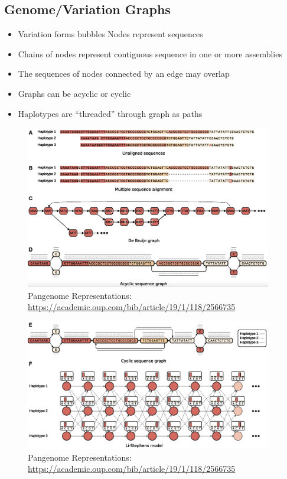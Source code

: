 \documentclass[
]{book}
\providecommand{\tightlist}{%
  \setlength{\itemsep}{0pt}\setlength{\parskip}{0pt}}
\begin{document}
\hypertarget{genomevariation-graphs}{%
\subsection{Genome/Variation Graphs}\label{genomevariation-graphs}}

\begin{itemize}
\tightlist
\item
  Variation forms bubbles Nodes represent sequences
\item
  Chains of nodes represent contiguous sequence in one or more assemblies
\item
  The sequences of nodes connected by an edge may overlap
\item
  Graphs can be acyclic or cyclic
\item
  Haplotypes are ``threaded'' through graph as paths
\end{itemize}

\begin{figure}
\centering
\includegraphics[width=0.96\textwidth,height=\textheight]{./Figures/VariationGraphA.png}
\caption{Pangenome Representations: \url{https://academic.oup.com/bib/article/19/1/118/2566735}}
\end{figure}

\begin{figure}
\centering
\includegraphics[width=0.96\textwidth,height=\textheight]{./Figures/VariationGraphB.png}
\caption{Pangenome Representations: \url{https://academic.oup.com/bib/article/19/1/118/2566735}}
\end{figure}
\end{document}
